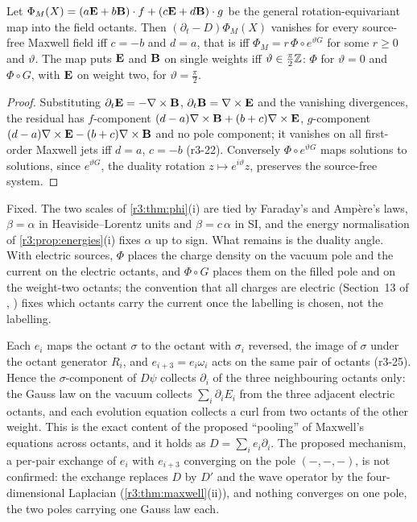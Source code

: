 \begin{proposition}
\label{r3:prop:maxunique}
Let $\Phi_M(X)=(a\mathbf E+b\mathbf B)\cdot f+(c\mathbf E+d\mathbf B)\cdot g$ be the general rotation-equivariant map into the field octants. Then $(\partial_t-D)\Phi_M(X)$ vanishes
for every source-free Maxwell field iff $c=-b$ and $d=a$, that is iff $\Phi_M=r\,\Phi\circ e^{\vartheta G}$ for some $r\ge0$ and $\vartheta$. The map puts
$\mathbf E$ and $\mathbf B$ on single weights iff $\vartheta\in\tfrac\pi2\mathbb{Z}$: $\Phi$ for $\vartheta=0$ and $\Phi\circ G$, with $\mathbf E$ on weight two, for $\vartheta=\tfrac\pi2$.
\end{proposition}

\begin{proof}
Substituting $\partial_t\mathbf E=-\nabla\times\mathbf B$, $\partial_t\mathbf B=\nabla\times\mathbf E$ and the vanishing divergences, the residual has $f$-component $(d-a)\nabla\times\mathbf B+(b+c)\nabla\times\mathbf E$,
$g$-component $(d-a)\nabla\times\mathbf E-(b+c)\nabla\times\mathbf B$ and no pole component; it vanishes on all first-order Maxwell jets iff $d=a$, $c=-b$ (r3-22). Conversely
$\Phi\circ e^{\vartheta G}$ maps solutions to solutions, since $e^{\vartheta G}$, the duality rotation $z\mapsto e^{i\vartheta}z$, preserves the source-free system.
\end{proof}

Fixed. The two scales of \cref{r3:thm:phi}(i) are tied by Faraday's and Amp\`ere's laws, $\beta=\alpha$ in Heaviside--Lorentz units and $\beta=c\,\alpha$
in SI, and the energy normalisation of \cref{r3:prop:energies}(i) fixes $\alpha$ up to sign. What remains is the duality angle. With electric
sources, $\Phi$ places the charge density on the vacuum pole and the current on the electric octants, and $\Phi\circ G$ places them on the
filled pole and on the weight-two octants; the convention that all charges are electric (Section~13 of \cite{ES17}, \cite{Jackson}) fixes which
octants carry the current once the labelling is chosen, not the labelling.

\begin{remark}
\label{r3:rem:pooling}
Each $e_i$ maps the octant $\sigma$ to the octant with $\sigma_i$ reversed, the image of $\sigma$ under the octant generator $R_i$, and
$e_{i+3}=e_i\omega_i$ acts on the same pair of octants (r3-25). Hence the $\sigma$-component of $D\psi$ collects $\partial_i$ of the three neighbouring
octants only: the Gauss law on the vacuum collects $\sum_i\partial_iE_i$ from the three adjacent electric octants, and each evolution equation
collects a curl from two octants of the other weight. This is the exact content of the proposed ``pooling'' of Maxwell's equations across
octants, and it holds as $D=\sum_ie_i\partial_i$. The proposed mechanism, a per-pair exchange of $e_i$ with $e_{i+3}$ converging on the pole
$(-,-,-)$, is not confirmed: the exchange replaces $D$ by $D'$ and the wave operator by the four-dimensional Laplacian
(\cref{r3:thm:maxwell}(ii)), and nothing converges on one pole, the two poles carrying one Gauss law each.
\end{remark}

